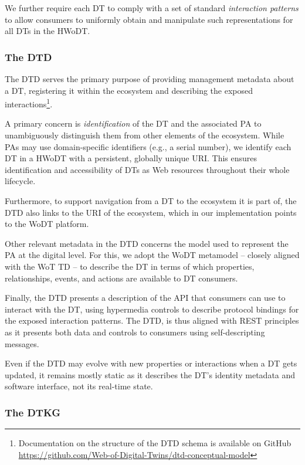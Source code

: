 We further require each \ac{DT} to comply with a set of standard \emph{interaction patterns} to allow consumers to uniformly obtain and manipulate such representations for all \acp{DT} in the \ac{HWoDT}.

\subsubsection{The \acl{DTD}}

The \ac{DTD} serves the primary purpose of providing management metadata about a \ac{DT}, registering it within the ecosystem and describing the exposed interactions\footnote{Documentation on the structure of the \ac{DTD} schema is available on GitHub \url{https://github.com/Web-of-Digital-Twins/dtd-conceptual-model}}.

A primary concern is \emph{identification} of the \ac{DT} and the associated \ac{PA} to unambiguously distinguish them from other elements of the ecosystem.
While \acp{PA} may use domain-specific identifiers (e.g., a serial number), we identify each \ac{DT} in a \ac{HWoDT} with a persistent, globally unique \ac{URI}.
This ensures identification and accessibility of \acp{DT} as Web resources throughout their whole lifecycle.

Furthermore, to support navigation from a \ac{DT} to the ecosystem it is part of, the \ac{DTD} also links to the \ac{URI} of the ecosystem, which in our implementation points to the \ac{WoDT} platform.

Other relevant metadata in the \ac{DTD} concerns the model used to represent the \ac{PA} at the digital level.
%
For this, we adopt the \ac{WoDT} metamodel -- closely aligned with the  \ac{WoT} \ac{TD} -- to describe the \ac{DT} in terms of which properties, relationships, events, and actions are available to \ac{DT} consumers. 

Finally, the \ac{DTD} presents a description of the \ac{API} that consumers can use to interact with the \ac{DT}, using hypermedia controls to describe protocol bindings for the exposed interaction patterns.
%
The \ac{DTD}, is thus aligned with \ac{REST} principles as it presents both data and controls to consumers using self-descripting messages.

Even if the \ac{DTD} may evolve with new properties or interactions when a \ac{DT} gets updated, it remains mostly static as it describes the \ac{DT}'s identity metadata and software interface, not its real-time state.

\subsubsection{The \acl{DTKG}}

